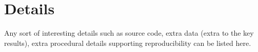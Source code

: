 \section{Details}
\label{sec:details}

Any sort of interesting details such as source code, extra data (extra
to the key results), extra procedural details supporting
reproducibility can be listed here.
